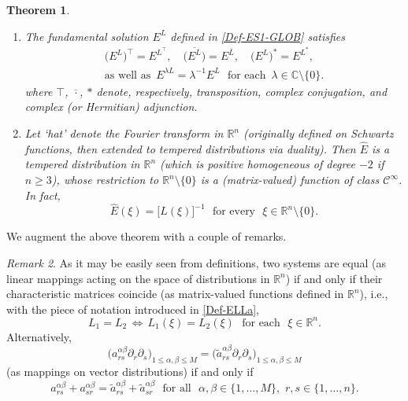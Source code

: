 \documentclass[11pt,reqno]{amsart}
\numberwithin{equation}{section}
\newtheorem{theorem}{Theorem}[section]
\theoremstyle{remark}
\newtheorem{remark}[theorem]{Remark}
\begin{document}
\begin{theorem}
\begin{enumerate}
\item[(5)] The fundamental solution $E^L$ defined in \eqref{Def-ES1-GLOB} satisfies 
%
\begin{equation}\label{E-Trans}
\begin{array}{c}
\big(E^L\big)^\top=E^{L^\top},\quad
\overline{\big(E^L\big)}=E^{\overline{L}},\quad
\big(E^L\big)^\ast=E^{L^\ast},
\\[8pt]
\text{as well as }\,E^{\lambda L}=\lambda^{-1}E^L
\,\,\text{ for each }\,\lambda\in{\mathbb{C}}\setminus\{0\}.
\end{array}
\end{equation}
%
where $\top$, $\overline{\cdot}$, $\ast$ denote, respectively, transposition, complex conjugation, 
and complex {\rm (}or Hermitian{\rm )} adjunction. 

\vskip 0.03in
\item[(6)] Let `hat' denote the Fourier transform in ${\mathbb{R}}^n$ {\rm (}originally defined 
on Schwartz functions, then extended to tempered distributions via duality{\rm )}.
Then $\widehat{E}$ is a tempered distribution in ${\mathbb{R}}^n$ {\rm (}which is positive homogeneous 
of degree $-2$ if $n\geq 3${\rm )}, whose restriction to ${\mathbb{R}}^n\setminus\{0\}$ 
is a {\rm (}matrix-valued{\rm )} function of class ${\mathscr{C}}^{\infty}$. In fact, 
%
\begin{equation}\label{E-ftXC}
\widehat{E}(\xi)=\big[L(\xi)\big]^{-1}\,\,\text{ for every }\,\,\xi\in{\mathbb{R}}^n\setminus\{0\}.
\end{equation}
\end{enumerate}
\end{theorem}

We augment the above theorem with a couple of remarks. 

\begin{remark}\label{tafh.R1}
As it may be easily seen from definitions, two systems are equal {\rm (}as linear mappings acting on the 
space of distributions in ${\mathbb{R}}^n${\rm )} if and only if their characteristic matrices coincide 
{\rm (}as matrix-valued functions defined in ${\mathbb{R}}^n${\rm )}, i.e., with the piece of notation 
introduced in \eqref{Def-ELLa}, 
%
\begin{equation}\label{eq:edxuye.FDa}
L_1=L_2\,\Longleftrightarrow\,L_1(\xi)=L_2(\xi)\,\,\text{ for each }\,\,\xi\in{\mathbb{R}}^n.
\end{equation}
%
Alternatively, 
%
\begin{equation}\label{L-def.vqusvq.I}
\Big(a^{\alpha\beta}_{rs}\partial_r\partial_s\Big)_{1\leq\alpha,\beta\leq M}
=\Big(\widetilde{a}^{\alpha\beta}_{rs}\partial_r\partial_s\Big)_{1\leq\alpha,\beta\leq M}
\end{equation}
%
(as mappings on vector distributions) if and only if 
%
\begin{equation}\label{L-def.vqusvq.II}
a^{\alpha\beta}_{rs}+a^{\alpha\beta}_{sr}
=\widetilde{a}^{\alpha\beta}_{rs}+\widetilde{a}^{\alpha\beta}_{sr}
\,\,\text{ for all }\,\,\alpha,\beta\in\{1,\dots,M\},\,\,r,s\in\{1,\dots,n\}.
\end{equation}
\end{remark}
\end{document}

